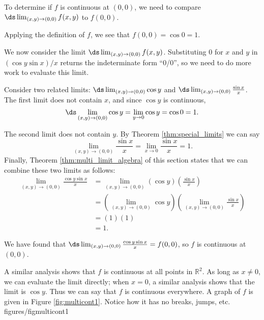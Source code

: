 {To determine if $f$ is continuous at $(0,0)$, we need to compare $\ds\lim_{(x,y)\to (0,0)} f(x,y)$ to $f(0,0)$. 

Applying the definition of $f$, we see that $f(0,0) = \cos 0 = 1$. 

We now consider the limit $\ds \lim_{(x,y)\to (0,0)} f(x,y)$. Substituting $0$ for $x$ and $y$ in $(\cos y\sin x)/x$ returns the indeterminate form ``0/0'', so we need to do more work to evaluate this limit.

Consider two related limits: $\ds \lim_{(x,y)\to (0,0)} \cos y$ and $\ds \lim_{(x,y)\to(0,0)} \frac{\sin x}x$. The first limit does not contain $x$, and since $\cos y$ is continuous, $$\ds \lim_{(x,y)\to (0,0)} \cos y =\lim_{y\to 0} \cos y = \cos 0 = 1.$$

The second limit does not contain $y$. By Theorem \ref{thm:special_limits} we can say
$$\lim_{(x,y)\to (0,0)} \frac{\sin x}{x} = \lim_{x\to 0} \frac{\sin x}{x} = 1.$$
Finally, Theorem \ref{thm:multi_limit_algebra} of this section states that we can combine these two limits as follows:
\begin{align*}
\lim_{(x,y)\to (0,0)} \frac{\cos y\sin x}{x} &= \lim_{(x,y)\to (0,0)} (\cos y)\left(\frac{\sin x}{x}\right) \\ 
&=\left(\lim_{(x,y)\to (0,0)} \cos y\right)\left(\lim_{(x,y)\to (0,0)} \frac{\sin x}{x}\right) \\
  &= (1)(1)\\
	&=1.
\end{align*}

We have found that $\ds \lim_{(x,y)\to (0,0)} \frac{\cos y\sin x}{x} = f(0,0)$, so $f$ is continuous at $(0,0)$.

A similar analysis shows that $f$ is continuous at all points in $\mathbb{R}^2$. As long as $x\neq0$, we can evaluate the limit directly; when $x=0$, a similar analysis shows that the limit is $\cos y$. Thus we can say that $f$ is continuous everywhere. A graph of $f$ is given in Figure \ref{fig:multicont1}. Notice how it has no breaks, jumps, etc.
{figures/figmulticont1}
}\\


